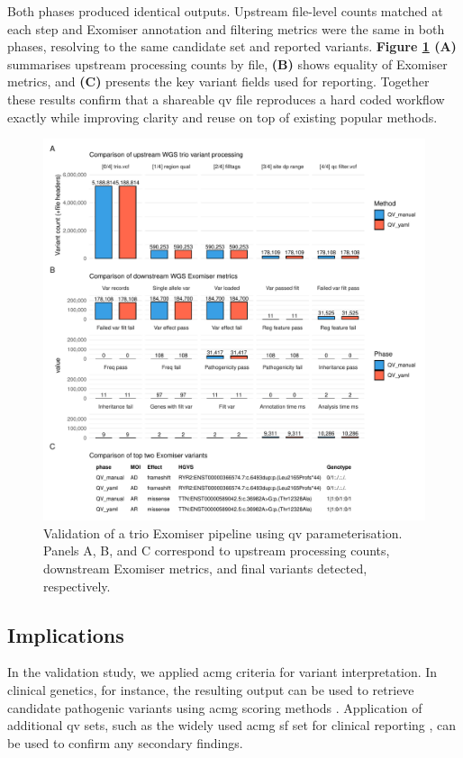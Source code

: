 Both phases produced identical outputs. Upstream file-level counts matched at each step and Exomiser annotation and filtering metrics were the same in both phases, resolving to the same candidate set and reported variants. 
\textbf{Figure \ref{fig:qv_exomiser_validation} (A)}
summarises upstream processing counts by file, \textbf{(B)} shows equality of Exomiser metrics, and \textbf{(C)} presents the key variant fields used for reporting. Together these results confirm that a shareable \ac{qv} file reproduces a hard coded workflow exactly while improving clarity and reuse on top of existing popular methods.

\begin{figure}[!t]
\centering
\includegraphics[width=\textwidth]{./images/qv_exomiser/exomiser_validation_bars_facet_metric.pdf}
\caption{Validation of a trio Exomiser pipeline using \ac{qv} parameterisation. Panels A, B, and C correspond to upstream processing counts, downstream Exomiser metrics, and final variants detected, respectively.}
\label{fig:qv_exomiser_validation}
\end{figure}


\subsection{Implications}
In the validation study, we applied \ac{acmg} criteria for variant interpretation. In clinical genetics, for instance, the resulting output can be used to retrieve candidate pathogenic variants using \ac{acmg} scoring methods \cite{richards2015standards, tavtigian2020fitting}.
Application of additional \ac{qv} sets, such as the widely used \ac{acmg} \ac{sf} set for clinical reporting \cite{miller2023acmg}, can be used to confirm any secondary findings.


